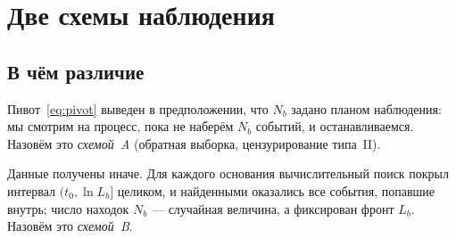 \documentclass[11pt,a4paper]{article}
\theoremstyle{plain}
\theoremstyle{remark}
\begin{document}
\section{Две схемы наблюдения}\label{sec:scheme}

\subsection{В чём различие}

Пивот~\eqref{eq:pivot} выведен в предположении, что $N_b$ задано планом наблюдения:
мы смотрим на процесс, пока не наберём $N_b$ событий, и останавливаемся. Назовём это
\emph{схемой~A} (обратная выборка, цензурирование типа~II).

Данные получены иначе. Для каждого основания вычислительный поиск покрыл интервал
$(t_0,\ln L_b]$ целиком, и найденными оказались все события, попавшие внутрь; число
находок $N_b$ --- случайная величина, а фиксирован фронт $L_b$. Назовём это
\emph{схемой~B}.
\end{document}
